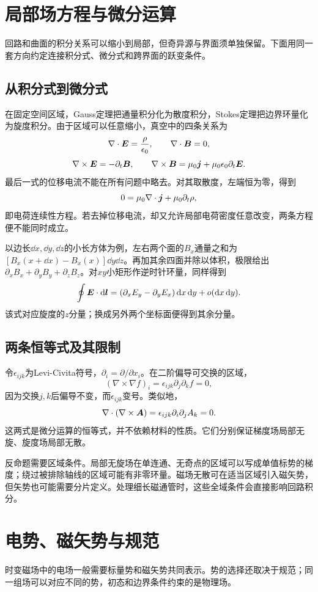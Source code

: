 \section{局部场方程与微分运算}\label{sec:i1-maxwell}
回路和曲面的积分关系可以缩小到局部，但奇异源与界面须单独保留。下面用同一套方向约定连接积分式、微分式和跨界面的跃变条件。

\subsection{从积分式到微分式}
在固定空间区域，Gauss定理把通量积分化为散度积分，Stokes定理把边界环量化为旋度积分。由于区域可以任意缩小，真空中的四条关系为
\[\nabla\cdot\bm{E}=\frac\rho{\epsilon_0},\qquad
\nabla\cdot\bm{B}=0,
\]
\[\nabla\times\bm{E}=-\partial_t\bm{B},\qquad
\nabla\times\bm{B}=\mu_0\bm{j}+\mu_0\epsilon_0\partial_t\bm{E}.
\]
最后一式的位移电流不能在所有问题中略去。对其取散度，左端恒为零，得到
\[0=\mu_0\nabla\cdot\bm{j}+\mu_0\partial_t\rho,
\]
即电荷连续性方程。若去掉位移电流，却又允许局部电荷密度任意改变，两条方程便不能同时成立。

以边长$\dd x,\dd y,\dd z$的小长方体为例，左右两个面的$B_x$通量之和为$[B_x(x+\dd x)-B_x(x)]\dd y\dd z$。再加其余四面并除以体积，极限给出$\partial_xB_x+\partial_yB_y+\partial_zB_z$。对$xy$小矩形作逆时针环量，同样得到
\[\oint\bm{E}\cdot\mathop{}\!\mathrm d\bm{l}
=(\partial_xE_y-\partial_yE_x)\mathop{}\!\mathrm d x\mathop{}\!\mathrm d y+o(\mathop{}\!\mathrm d x\mathop{}\!\mathrm d y).
\]
该式对应旋度的$z$分量；换成另外两个坐标面便得到其余分量。

\subsection{两条恒等式及其限制}
令$\epsilon_{ijk}$为Levi-Civita符号，$\partial_i=\partial/\partial x_i$。在二阶偏导可交换的区域，
\[(\nabla\times\nabla f)_i
=\epsilon_{ijk}\partial_j\partial_kf=0,
\]
因为交换$j,k$后偏导不变，而$\epsilon_{ijk}$变号。类似地，
\[\nabla\cdot(\nabla\times\bm{A})
=\epsilon_{ijk}\partial_i\partial_jA_k=0.
\]
这两式是微分运算的恒等式，并不依赖材料的性质。它们分别保证梯度场局部无旋、旋度场局部无散。

反命题需要区域条件。局部无旋场在单连通、无奇点的区域可以写成单值标势的梯度；绕过被排除轴线的区域可能有非零环量。磁场无散可在适当区域引入磁矢势，但矢势也可能需要分片定义。处理细长磁通管时，这些全域条件会直接影响回路积分。



\section{电势、磁矢势与规范}\label{sec:i1-potential}
时变磁场中的电场一般需要标量势和磁矢势共同表示。势的选择还取决于规范；同一组场可以对应不同的势，初态和边界条件约束的是物理场。

